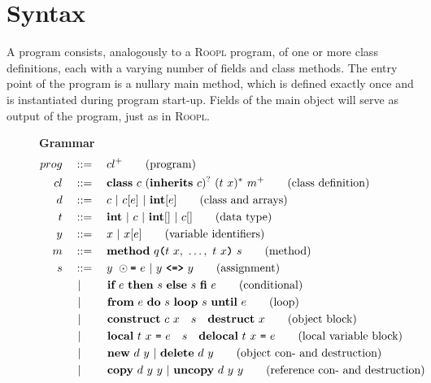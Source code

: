 \section{Syntax}
\label{sec:syntax}
A \rooplpp program consists, analogously to a \textsc{Roopl} program, of one or more class definitions, each with a varying number of fields and class methods. The entry point of the program is a nullary main method, which is defined exactly once and is instantiated during program start-up. Fields of the main object will serve as output of the program, just as in \textsc{Roopl}.
\begin{figure}[h]
    \centering
    \vspace{3mm}
    \textbf{\rooplpp Grammar}
    \begin{align}
    prog		\quad&::= \quad cl^+ \tag{program}\\
    cl			\quad&::=\quad \textbf{class}\ c\ (\textbf{inherits}\ c)^?\ (t\ x)^*\ m^+\tag{class definition}\\
    d           \quad&::=\quad c\ |\ c[e]\ |\ \textbf{int}[e] \tag{class and arrays}\\
    t			\quad&::=\quad \textbf{int}\ |\ c\ |\ \textbf{int}[]\ |\ c[]\tag{data type}\\
    y          \quad&::=\quad x\ |\ x[e] \tag{variable identifiers}\\
    m			\quad&::=\quad \textbf{method}\ q\textbf{\texttt{(}}t\ x,\ \dots,\ t\ x\textbf{\texttt{)}}\ s\tag{method}\\
    s			\quad&::=\quad y\ \odot\textbf{\texttt{=}}\ e\ |\ y\ \textbf{\texttt{<=>}}\ y\tag{assignment}\\\
    			&\ |\ \qquad \textbf{if}\ e\ \textbf{then}\ s\ \textbf{else}\ s\ \textbf{fi}\ e\tag{conditional}\\
    			&\ |\ \qquad \textbf{from}\ e\ \textbf{do}\ s\ \textbf{loop}\ s\ \textbf{until}\ e\tag{loop}\\
                &\ |\ \qquad \textbf{construct}\ c\ x\quad s\quad\textbf{destruct}\ x\tag{object block}\\
                &\ |\ \qquad \textbf{local}\ t\ x\ \texttt{=}\ e\quad s\quad\textbf{delocal}\ t\ x\ \texttt{=}\ e\tag{local variable block}\\
                &\ |\ \qquad \textbf{new}\ d\ y\ |\ \textbf{delete}\ d\ y \tag{object con- and destruction}\\
                &\ |\ \qquad \textbf{copy}\ d\ y\ y\ |\ \textbf{uncopy}\ d\ y\ y \tag{reference con- and destruction}\\

\end{align}
\end{figure}
